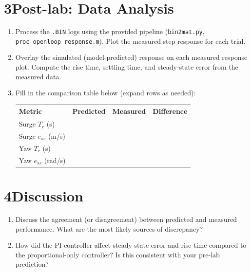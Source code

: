 \documentclass[11pt]{article}
\begin{document}
\section*{3\quad Post-lab: Data Analysis}

\begin{enumerate}[resume]

\item Process the \texttt{.BIN} logs using the provided pipeline
  (\texttt{bin2mat.py}, \texttt{proc\_openloop\_response.m}).
  Plot the measured step response for each trial.

\item Overlay the simulated (model-predicted) response on each measured
  response plot.  Compute the rise time, settling time, and steady-state
  error from the measured data.

\item Fill in the comparison table below (expand rows as needed):

  \begin{center}
  \begin{tabular}{lccc}
    \hline
    Metric & Predicted & Measured & Difference \\
    \hline
    Surge $T_r$ (s) & & & \\
    Surge $e_{ss}$ (m/s) & & & \\
    Yaw $T_r$ (s) & & & \\
    Yaw $e_{ss}$ (rad/s) & & & \\
    \hline
  \end{tabular}
  \end{center}

\end{enumerate}

\section*{4\quad Discussion}

\begin{enumerate}[resume]

\item Discuss the agreement (or disagreement) between predicted and measured
  performance.  What are the most likely sources of discrepancy?

\item How did the PI controller affect steady-state error and rise time compared
  to the proportional-only controller?  Is this consistent with your
  pre-lab prediction?

\end{enumerate}
\end{document}
